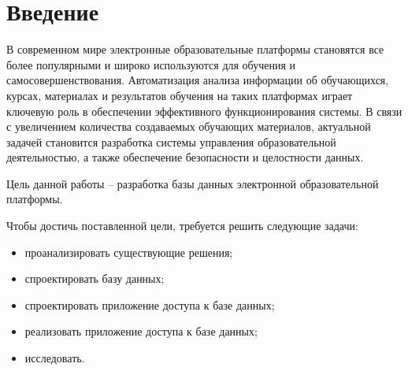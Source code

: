 \chapter*{Введение}

В современном мире электронные образовательные платформы становятся все более популярными и широко используются для обучения и самосовершенствования. Автоматизация анализа информации об обучающихся, курсах, материалах и результатов обучения на таких платформах играет ключевую роль в обеспечении эффективного функционирования системы. В связи с увеличением количества создаваемых обучающих материалов, актуальной задачей становится разработка системы управления образовательной деятельностью, а также обеспечение безопасности и целостности данных.

Цель данной работы -- разработка базы данных электронной образовательной платформы.

Чтобы достичь поставленной цели, требуется решить следующие задачи: 
\begin{itemize}
    \item проанализировать существующие решения;
    \item спроектировать базу данных;
    \item спроектировать приложение доступа к базе данных;
    \item реализовать приложение доступа к базе данных;
    \item исследовать.
\end{itemize}
